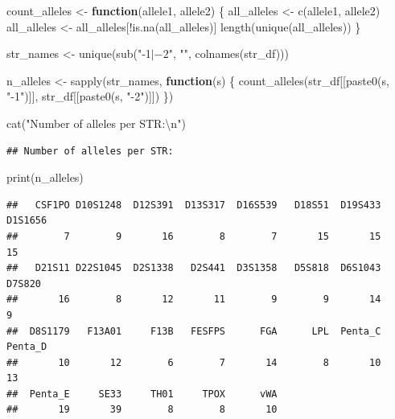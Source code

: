 \documentclass[
]{article}
\newenvironment{Shaded}{\begin{snugshade}}{\end{snugshade}}
\newcommand{\ControlFlowTok}[1]{\textcolor[rgb]{0.13,0.29,0.53}{\textbf{#1}}}
\newcommand{\FunctionTok}[1]{\textcolor[rgb]{0.00,0.00,0.00}{#1}}
\newcommand{\NormalTok}[1]{#1}
\newcommand{\OtherTok}[1]{\textcolor[rgb]{0.56,0.35,0.01}{#1}}
\newcommand{\SpecialCharTok}[1]{\textcolor[rgb]{0.00,0.00,0.00}{#1}}
\newcommand{\StringTok}[1]{\textcolor[rgb]{0.31,0.60,0.02}{#1}}
\begin{document}
\begin{Shaded}
\begin{Highlighting}[]
\NormalTok{count\_alleles }\OtherTok{\textless{}{-}} \ControlFlowTok{function}\NormalTok{(allele1, allele2) \{}
\NormalTok{  all\_alleles }\OtherTok{\textless{}{-}} \FunctionTok{c}\NormalTok{(allele1, allele2)}
\NormalTok{  all\_alleles }\OtherTok{\textless{}{-}}\NormalTok{ all\_alleles[}\SpecialCharTok{!}\FunctionTok{is.na}\NormalTok{(all\_alleles)]}
  \FunctionTok{length}\NormalTok{(}\FunctionTok{unique}\NormalTok{(all\_alleles))}
\NormalTok{\}}

\NormalTok{str\_names }\OtherTok{\textless{}{-}} \FunctionTok{unique}\NormalTok{(}\FunctionTok{sub}\NormalTok{(}\StringTok{"{-}1$|{-}2$"}\NormalTok{, }\StringTok{""}\NormalTok{, }\FunctionTok{colnames}\NormalTok{(str\_df)))}

\NormalTok{n\_alleles }\OtherTok{\textless{}{-}} \FunctionTok{sapply}\NormalTok{(str\_names, }\ControlFlowTok{function}\NormalTok{(s) \{}
  \FunctionTok{count\_alleles}\NormalTok{(str\_df[[}\FunctionTok{paste0}\NormalTok{(s, }\StringTok{"{-}1"}\NormalTok{)]], str\_df[[}\FunctionTok{paste0}\NormalTok{(s, }\StringTok{"{-}2"}\NormalTok{)]])}
\NormalTok{\})}


\FunctionTok{cat}\NormalTok{(}\StringTok{"Number of alleles per STR:}\SpecialCharTok{\textbackslash{}n}\StringTok{"}\NormalTok{)}
\end{Highlighting}
\end{Shaded}

\begin{verbatim}
## Number of alleles per STR:
\end{verbatim}

\begin{Shaded}
\begin{Highlighting}[]
\FunctionTok{print}\NormalTok{(n\_alleles)}
\end{Highlighting}
\end{Shaded}

\begin{verbatim}
##   CSF1PO D10S1248  D12S391  D13S317  D16S539   D18S51  D19S433  D1S1656 
##        7        9       16        8        7       15       15       15 
##   D21S11 D22S1045  D2S1338   D2S441  D3S1358   D5S818  D6S1043   D7S820 
##       16        8       12       11        9        9       14        9 
##  D8S1179   F13A01     F13B   FESFPS      FGA      LPL  Penta_C  Penta_D 
##       10       12        6        7       14        8       10       13 
##  Penta_E     SE33     TH01     TPOX      vWA 
##       19       39        8        8       10
\end{verbatim}
\end{document}
